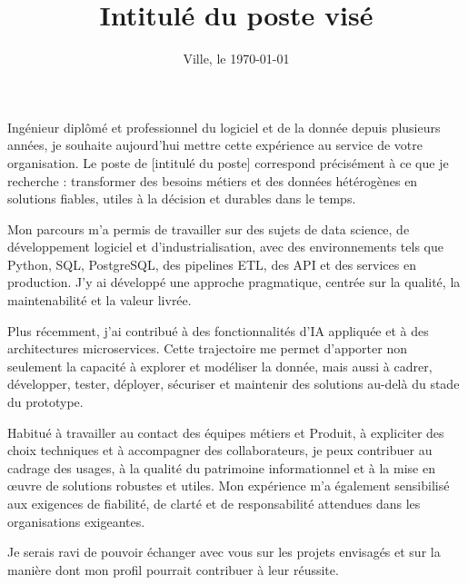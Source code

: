 \documentclass[10pt,a4paper,sans]{moderncv}
\title{Intitulé du poste visé}
\date{Ville, le \today}
\begin{document}
\makelettertitle

Ingénieur diplômé et professionnel du logiciel et de la donnée depuis plusieurs années, je souhaite aujourd'hui mettre cette expérience au service de votre organisation. Le poste de [intitulé du poste] correspond précisément à ce que je recherche : transformer des besoins métiers et des données hétérogènes en solutions fiables, utiles à la décision et durables dans le temps.

Mon parcours m'a permis de travailler sur des sujets de data science, de développement logiciel et d'industrialisation, avec des environnements tels que Python, SQL, PostgreSQL, des pipelines ETL, des API et des services en production. J'y ai développé une approche pragmatique, centrée sur la qualité, la maintenabilité et la valeur livrée.

Plus récemment, j'ai contribué à des fonctionnalités d'IA appliquée et à des architectures microservices. Cette trajectoire me permet d'apporter non seulement la capacité à explorer et modéliser la donnée, mais aussi à cadrer, développer, tester, déployer, sécuriser et maintenir des solutions au-delà du stade du prototype.

Habitué à travailler au contact des équipes métiers et Produit, à expliciter des choix techniques et à accompagner des collaborateurs, je peux contribuer au cadrage des usages, à la qualité du patrimoine informationnel et à la mise en œuvre de solutions robustes et utiles. Mon expérience m'a également sensibilisé aux exigences de fiabilité, de clarté et de responsabilité attendues dans les organisations exigeantes.

Je serais ravi de pouvoir échanger avec vous sur les projets envisagés et sur la manière dont mon profil pourrait contribuer à leur réussite.

\makeletterclosing
\end{document}
